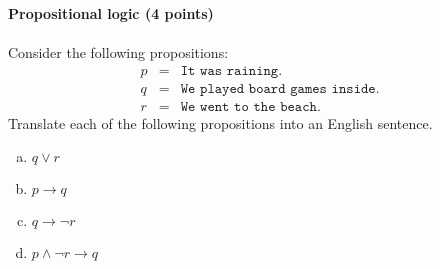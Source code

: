 \documentclass[12pt]{article}
\newenvironment{question}[2][Question]{\begin{trivlist}
\item[\hskip \labelsep {\bfseries #1}\hskip \labelsep {\bfseries #2.}]}{\end{trivlist}}
\newenvironment{solution}[1][Solution:]{\begin{trivlist}
\item[\hskip \labelsep {\bfseries #1}\hskip \labelsep {\bfseries}]\color{blue}}{\end{trivlist}}
\begin{document}
\clearpage
\begin{question}{2}\textbf{Propositional logic (4 points)}\\\\

Consider the following propositions:
\begin{eqnarray*}
  p & = & \texttt{It was raining.}\\
  q & = & \texttt{We played board games inside.}\\
  r & = & \texttt{We went to the beach.}
\end{eqnarray*}
Translate each of the following propositions into an English sentence.
\begin{enumerate}[(a)]  
  \item $q \vee r$\vspace{8em}
  \item $p \rightarrow q$\vspace{8em}
  \item $q \rightarrow \neg r$\vspace{8em}
  \item $p \wedge \neg r \rightarrow q$
\end{enumerate}
\end{question}



    
 
 
\end{document}
